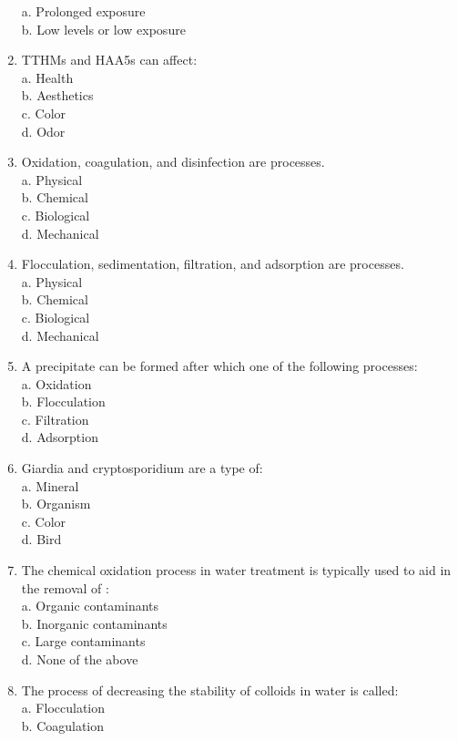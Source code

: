 \begin{enumerate}
a. Prolonged exposure\\
b. Low levels or low exposure\\
\item TTHMs and HAA5s can affect:\\
a. Health\\
b. Aesthetics\\
c. Color\\
d. Odor\\
\item Oxidation, coagulation, and disinfection are processes.\\
a. Physical\\
b. Chemical\\
c. Biological\\
d. Mechanical\\
\item Flocculation, sedimentation, filtration, and adsorption are processes.\\
a. Physical\\
b. Chemical\\
c. Biological\\
d. Mechanical\\
\item A precipitate can be formed after which one of the following processes:\\
a. Oxidation\\
b. Flocculation\\
c. Filtration\\
d. Adsorption\\
\item Giardia and cryptosporidium are a type of:\\
a. Mineral\\
b. Organism\\
c. Color\\
d. Bird\\
\item The chemical oxidation process in water treatment is typically used to aid in the removal of :\\
a. Organic contaminants\\
b. Inorganic contaminants\\
c. Large contaminants\\
d. None of the above\\
\item The process of decreasing the stability of colloids in water is called:\\
a. Flocculation\\
b. Coagulation\\

\end{enumerate}
